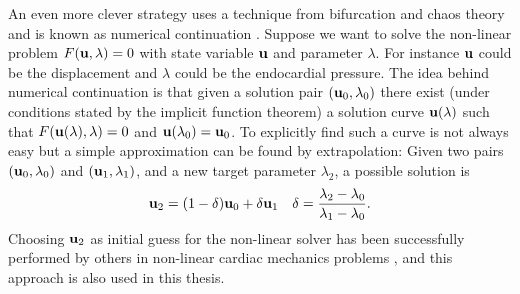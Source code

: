 An even more clever strategy uses a technique from bifurcation and
chaos theory and is known as numerical continuation
\cite{allgower2003introduction}.  Suppose we want to
solve the non-linear problem $F(\mathbf{u}, \lambda)=0$ with state variable
$\mathbf{u}$ and parameter $\lambda$. For instance $\mathbf{u}$ could be the
displacement and $\lambda$ could be the endocardial pressure.
The idea behind numerical continuation is that given a solution pair
$(\mathbf{u}_0, \lambda_0)$ there exist (under conditions stated by the
implicit function theorem) a solution curve $\mathbf{u}(\lambda)$ such that
$F(\mathbf{u}(\lambda), \lambda)=0$ and $\mathbf{u}(\lambda_0) = \mathbf{u}_0$.
To explicitly find such a curve is not always easy but a simple
approximation can be found by extrapolation: Given two pairs
$(\mathbf{u}_0, \lambda_0)$ and $(\mathbf{u}_1, \lambda_1)$, and a new target
parameter $\lambda_2$, a possible solution is 
\begin{align}
  \mathbf{u}_2 =  (1-\delta)\mathbf{u}_0 + \delta \mathbf{u}_1 && \delta = \frac{\lambda_2 - \lambda_0}{\lambda_1 - \lambda_0}.
\end{align}
Choosing $\mathbf{u}_2$ as initial guess for the non-linear solver has been
successfully performed by others in non-linear cardiac mechanics
problems \cite{pezzuto2013mechanics}, and this approach is also used
in this thesis. 





